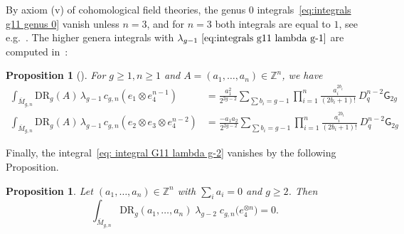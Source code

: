\documentclass{amsart}
\numberwithin{equation}{section} %
\theoremstyle{plain}
\newtheorem{prop}[theorem]{Proposition}
\theoremstyle{remark}
\begin{document}
By axiom (v) of cohomological field theories, the genus $0$ integrals~\eqref{eq:integrals g11 genus 0} vanish unless $n=3$, and for $n=3$ both integrals are equal to $1$, see e.g.~\cite{buryak_22}. The higher genera integrals with $\lambda_{g-1}~\eqref{eq:integrals g11 lambda g-1}$ are computed in~\cite{pixton_oberdieck_23}:
\begin{prop}[{\cite[Theorem 6.10]{pixton_oberdieck_23}}]
	\label{prop: omega-class}
	For $g\geq 1, n\geq 1$ and $A=(a_1,\ldots,a_n)\in \mathbb{Z}^n$, we have 
\begin{align*}
			\int _{\overline{M}_{g,n}} \mathrm{DR}_{g}( A)\, \lambda_{g-1}\, c_{g,n}\left( e_1\otimes e_{4}^{n-1}\right) & = \frac {a_{1}^{2}}{2^{2g-2}}\sum _{\sum b_{i} =g-1}\prod _{i=1}^{n}\frac{a_{i}^{2b_i}}{( 2b_{i} +1) !} \ D_{q}^{n-2} \mathsf{G}_{2g}
			\\
				\int _{\overline{M}_{g,n}} \mathrm{DR}_{g}( A) \, \lambda_{g-1}\, c_{g,n}\left( e_{2} \otimes e_3 \otimes e_{4}^{n-2}\right) & =\frac {-a_{1}a_{2}}{2^{2g-2}}\sum _{\sum b_{i} =g-1}\prod _{i=1}^{n}\frac{a_{i}^{2b_i}}{( 2b_{i} +1) !} \ D_{q}^{n-2} \mathsf{G}_{2g}
\end{align*}
\end{prop}

Finally, the integral~\eqref{eq: integral G11 lambda g-2} vanishes by the following Proposition. 

\begin{prop}\label{prop: vanishing}
Let $(a_1,\dots,a_n)\in\mathbb{Z}^n$ with $\sum_i a_i=0$ and $g\geq 2$.
Then
\[ 
\int_{\overline{M}_{g,n}} \mathrm{DR}_g(a_1,\ldots,a_n) \; \lambda_{g-2}\;c_{g,n}\!\big(e_4^{\otimes n}\big) =0.
\]
\end{prop}
\end{document}
